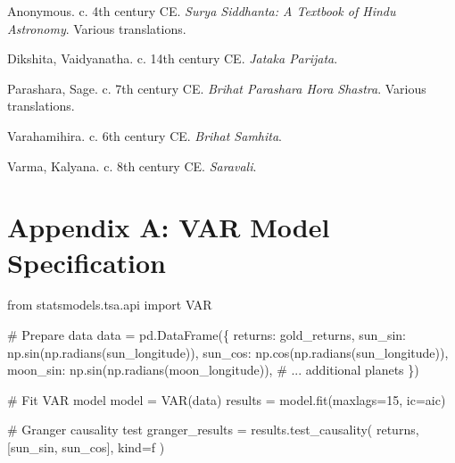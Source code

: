 \documentclass[
  11pt,
  a4paper,
  oneside,
  openany]{article}
\newenvironment{Shaded}{\begin{snugshade}}{\end{snugshade}}
\newcommand{\CommentTok}[1]{\textcolor[rgb]{0.37,0.37,0.37}{#1}}
\newcommand{\DecValTok}[1]{\textcolor[rgb]{0.68,0.00,0.00}{#1}}
\newcommand{\ImportTok}[1]{\textcolor[rgb]{0.00,0.46,0.62}{#1}}
\newcommand{\NormalTok}[1]{\textcolor[rgb]{0.00,0.23,0.31}{#1}}
\newcommand{\OperatorTok}[1]{\textcolor[rgb]{0.37,0.37,0.37}{#1}}
\newcommand{\StringTok}[1]{\textcolor[rgb]{0.13,0.47,0.30}{#1}}
\newlength{\cslhangindent}
\newenvironment{CSLReferences}[2] %
 {\begin{list}{}{%
  \setlength{\itemindent}{0pt}
  \setlength{\leftmargin}{0pt}
  \setlength{\parsep}{0pt}
  \ifodd #1
   \setlength{\leftmargin}{\cslhangindent}
   \setlength{\itemindent}{-1\cslhangindent}
  \fi
  \setlength{\itemsep}{#2\baselineskip}}}
 {\end{list}}
\begin{document}
\label{refs}
\begin{CSLReferences}{1}{0}
Anonymous. c. 4th century CE. \emph{Surya Siddhanta: A Textbook of Hindu
Astronomy}. Various translations.

Dikshita, Vaidyanatha. c. 14th century CE. \emph{Jataka Parijata}.

Parashara, Sage. c. 7th century CE. \emph{Brihat Parashara Hora
Shastra}. Various translations.

Varahamihira. c. 6th century CE. \emph{Brihat Samhita}.

Varma, Kalyana. c. 8th century CE. \emph{Saravali}.

\end{CSLReferences}

\section{Appendix A: VAR Model
Specification}\label{appendix-a-var-model-specification}

\begin{Shaded}
\begin{Highlighting}[]
\ImportTok{from}\NormalTok{ statsmodels.tsa.api }\ImportTok{import}\NormalTok{ VAR}

\CommentTok{\# Prepare data}
\NormalTok{data }\OperatorTok{=}\NormalTok{ pd.DataFrame(\{}
    \StringTok{\textquotesingle{}returns\textquotesingle{}}\NormalTok{: gold\_returns,}
    \StringTok{\textquotesingle{}sun\_sin\textquotesingle{}}\NormalTok{: np.sin(np.radians(sun\_longitude)),}
    \StringTok{\textquotesingle{}sun\_cos\textquotesingle{}}\NormalTok{: np.cos(np.radians(sun\_longitude)),}
    \StringTok{\textquotesingle{}moon\_sin\textquotesingle{}}\NormalTok{: np.sin(np.radians(moon\_longitude)),}
    \CommentTok{\# ... additional planets}
\NormalTok{\})}

\CommentTok{\# Fit VAR model}
\NormalTok{model }\OperatorTok{=}\NormalTok{ VAR(data)}
\NormalTok{results }\OperatorTok{=}\NormalTok{ model.fit(maxlags}\OperatorTok{=}\DecValTok{15}\NormalTok{, ic}\OperatorTok{=}\StringTok{\textquotesingle{}aic\textquotesingle{}}\NormalTok{)}

\CommentTok{\# Granger causality test}
\NormalTok{granger\_results }\OperatorTok{=}\NormalTok{ results.test\_causality(}
    \StringTok{\textquotesingle{}returns\textquotesingle{}}\NormalTok{,}
\NormalTok{    [}\StringTok{\textquotesingle{}sun\_sin\textquotesingle{}}\NormalTok{, }\StringTok{\textquotesingle{}sun\_cos\textquotesingle{}}\NormalTok{],}
\NormalTok{    kind}\OperatorTok{=}\StringTok{\textquotesingle{}f\textquotesingle{}}
\NormalTok{)}
\end{Highlighting}
\end{Shaded}
\end{document}
